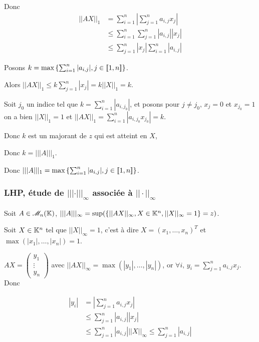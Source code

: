 Donc 
\begin{align*}
    || AX ||_1 & = \sum_{i=1}^n \left| \sum_{j=1}^n a_{i, j} x_j \right| \\
    & \leqslant \sum_{i=1}^n \sum_{j=1}^n |a_{i, j}| |x_j| \\
    & \leqslant \sum_{j=1}^n |x_j| \sum_{i=1}^n |a_{i, j}| 
\end{align*}


Posons $k = \max \left\{ \sum_{i=1}^n |a_{i, j}|, j \in [\![1, n]\!] \right\}$.

Alors $||AX||_1 \leqslant k \sum_{j=1}^n |x_j| = k ||X||_1 = k$.


Soit $j_0$ un indice tel que $k = \sum_{i=1}^n |a_{i, j_0}|$, et posons pour 
$j \neq j_0, \, x_j = 0$ et $x_{j_0} = 1$ on a bien $||X||_1 = 1$ et
$||AX||_1 = \sum_{i=1}^n |a_{i, j_0} x_{j_0}| = k$.

Donc $k$ est un majorant de $z$ qui est atteint en $X$,

Donc $k = |||A|||_1$.

Donc $|||A|||_1 = \max \left\{ \sum_{i=1}^n |a_{i, j}|, j \in [\![1, n]\!] \right\}$.


\subsubsection{LHP, étude de $||| \cdot |||_\infty$ associée à $|| \cdot ||_\infty$}

Soit $A \in \mathscr M_n(\mathbb{K})$, $|||A|||_\infty = \sup (\{ ||AX||_\infty, X \in \mathbb{K}^n, ||X||_\infty = 1 \} = z) $.

Soit $X \in \mathbb{K}^n$ tel que $||X||_\infty = 1$, c'est à dire $X = (x_1, \ldots, x_n)^T$ et $\max(|x_1|, \ldots, |x_n|) = 1$.

$AX = \begin{pmatrix}
    y_1 \\
    \vdots \\
    y_n
\end{pmatrix}$  avec $||AX||_\infty = \max(|y_1|, \ldots, |y_n|)$, 
or $\displaystyle \forall i, \, y_i = \sum_{j=1}^n a_{i, j} x_j$. Donc 

\begin{align*}
    |y_i| & = \left| \sum_{j=1}^n a_{i, j} x_j \right| \\
    & \leqslant \sum_{j=1}^n |a_{i, j}| |x_j| \\
    & \leqslant \sum_{j=1}^n |a_{i, j}| ||X||_\infty \leqslant \sum_{j=1}^n |a_{i, j}|
\end{align*}

